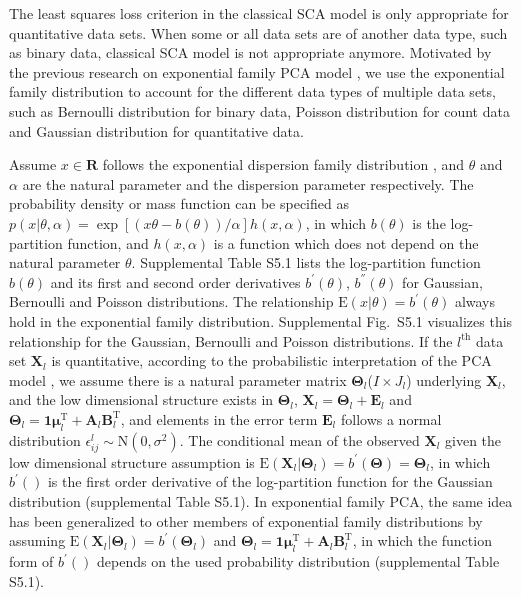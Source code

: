 The least squares loss criterion in the classical SCA model is only appropriate for quantitative data sets. When some or all data sets are of another data type, such as binary data, classical SCA model is not appropriate anymore. Motivated by the previous research on exponential family PCA model \cite{schein2003generalized}, we use the exponential family distribution to account for the different data types of multiple data sets, such as Bernoulli distribution for binary data, Poisson distribution for count data and Gaussian distribution for quantitative data.

Assume $x \in \mathbf{R}$ follows the exponential dispersion family distribution \cite{agresti2013categorical}, and $\theta$ and $\alpha$ are the natural parameter and the dispersion parameter respectively. The probability density or mass function can be specified as $p(x|\theta,\alpha) = \exp \left[(x\theta - b(\theta))/\alpha \right] h(x,\alpha)$, in which $b(\theta)$ is the log-partition function, and $h(x,\alpha)$ is a function which does not depend on the natural parameter $\theta$. Supplemental Table S5.1 lists the log-partition function $b(\theta)$ and its first and second order derivatives $b^{'}(\theta)$, $b^{''}(\theta)$ for Gaussian, Bernoulli and Poisson distributions. The relationship $\text{E}(x|\theta) = b^{'}(\theta)$ always hold in the exponential family distribution. Supplemental Fig.~S5.1 visualizes this relationship for the Gaussian, Bernoulli and Poisson distributions. If the $l^{\text{th}}$ data set $\mathbf{X}_l$ is quantitative, according to the probabilistic interpretation of the PCA model \cite{tipping1999probabilistic}, we assume there is a natural parameter matrix $\mathbf{\Theta}_l$($I\times J_l$) underlying $\mathbf{X}_l$, and the low dimensional structure exists in $\mathbf{\Theta}_l$, $\mathbf{X}_l = \mathbf{\Theta}_l + \mathbf{E}_l$ and $\mathbf{\Theta}_l = \mathbf{1}\bm{\mu}_l^{\text{T}} + \mathbf{A}_l\mathbf{B}_l^{\text{T}}$, and elements in the error term $\mathbf{E}_l$ follows a normal distribution $\epsilon_{ij}^{l} \sim \text{N}(0,\sigma^2)$. The conditional mean of the observed $\mathbf{X}_l$ given the low dimensional structure assumption is $\text{E}(\mathbf{X}_l| \mathbf{\Theta}_l) = b^{'}(\mathbf{\Theta}) = \mathbf{\Theta}_l$, in which $b^{'}()$ is the first order derivative of the log-partition function for the Gaussian distribution (supplemental Table S5.1). In exponential family PCA, the same idea has been generalized to other members of exponential family distributions by assuming $\text{E}(\mathbf{X}_l| \mathbf{\Theta}_l) = b^{'}(\mathbf{\Theta}_l)$ and $\mathbf{\Theta}_l = \mathbf{1}\bm{\mu}_l^{\text{T}} + \mathbf{A}_l\mathbf{B}_l^{\text{T}}$, in which the function form of $b^{'}()$ depends on the used probability distribution (supplemental Table S5.1).

